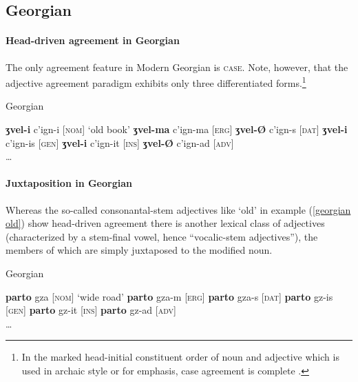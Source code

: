 \subsection{Georgian}\label{georgian synchr}
\paragraph{Head-driven agreement in Georgian}
The only agreement feature in Modern Georgian is \textsc{case}. Note, however, that the adjective agreement paradigm exhibits only three differentiated forms.\footnote{In the marked head-initial constituent order of noun and adjective which is used in archaic style or for emphasis, case agreement is complete \citep[59]{tuite1998}.}
\begin{exe}
\label{georgian old}
\ex \rm{Georgian \citep[236]{aronson1991}}
\begin{xlist}
\ex \textbf{ʒvel-i} c'ign-i		\rm{[\textsc{nom}] ‘old book’}
\ex \textbf{ʒvel-ma} c'ign-ma	\rm{[\textsc{erg}]}
\ex \textbf{ʒvel-Ø} c'ign-s	\rm{[\textsc{dat}]}
\ex \textbf{ʒvel-i} c'ign-is		\rm{[\textsc{gen}]}
\ex \textbf{ʒvel-i} c'ign-it		\rm{[\textsc{ins}]}
\ex \textbf{ʒvel-Ø} c'ign-ad	\rm{[\textsc{adv}]}\\
\dots
\end{xlist}
\end{exe}

\paragraph{Juxtaposition in Georgian}
Whereas the so-called consonantal-stem adjectives like ‘old’ in example (\ref{georgian old}) show head-driven agreement there is another lexical class of adjectives (characterized by a stem-final vowel, hence “vocalic-stem adjectives”), the members of which are simply juxtaposed to the modified noun.
\begin{exe}
\ex \rm{Georgian \citep[236]{aronson1991}}
\begin{xlist}
\ex \textbf{parto} gza	\rm[{\textsc{nom}] ‘wide road’}
\ex \textbf{parto} gza-m	\rm[{\textsc{erg}]}
\ex \textbf{parto} gza-s	\rm[{\textsc{dat}]}
\ex \textbf{parto} gz-is	\rm[{\textsc{gen}]}
\ex \textbf{parto} gz-it	\rm[{\textsc{ins}]}
\ex \textbf{parto} gz-ad	\rm[{\textsc{adv}]}\\
\dots
\end{xlist}
\end{exe}

